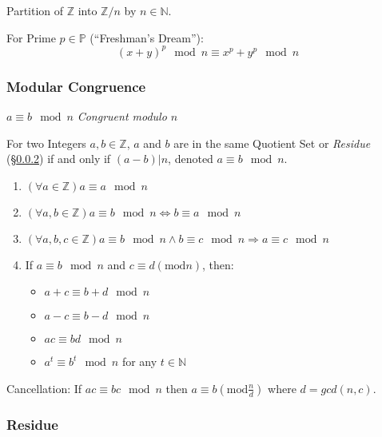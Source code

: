 Partition of $\mathbb{Z}$ into $\mathbb{Z}/n$ by $n \in \mathbb{N}$.

For Prime $p \in \mathbb{P}$ (``Freshman's Dream''):
\[
  (x+y)^p \mod n \equiv x^p + y^p \mod n
\]



\subsubsection{Modular Congruence}\label{sec:modular_congruence}

$a \equiv b \mod n$ \emph{Congruent modulo $n$}

For two Integers $a,b \in \mathbb{Z}$, $a$ and $b$ are in the same
Quotient Set or \emph{Residue} (\S\ref{sec:residue}) if and only if
$(a - b)|n$, denoted $a \equiv b \mod n$.

\begin{enumerate}

  \item $(\forall a \in \mathbb{Z}) a \equiv a \mod n$

  \item $(\forall a,b \in \mathbb{Z}) a \equiv b \mod n
    \Leftrightarrow b \equiv a \mod n$

  \item $(\forall a,b,c \in \mathbb{Z}) a \equiv b \mod n
    \wedge b \equiv c \mod n \Rightarrow a \equiv c
    \mod n$

  \item
    If $a \equiv b \mod n$ and $c \equiv d (\mathrm{mod }
    n)$, then:
    \begin{itemize}
    \item $a + c \equiv b + d \mod n$
    \item $a - c \equiv b - d \mod n$
    \item $ac \equiv bd \mod n$
    \item $a^t \equiv b ^t \mod n$ for any $t \in
      \mathbb{N}$
    \end{itemize}

\end{enumerate}

Cancellation: If $ac \equiv bc \mod n$ then $a \equiv b
(\mathrm{mod } \frac{n}{d})$ where $d = gcd(n,c)$.



\subsubsection{Residue}\label{sec:residue}

